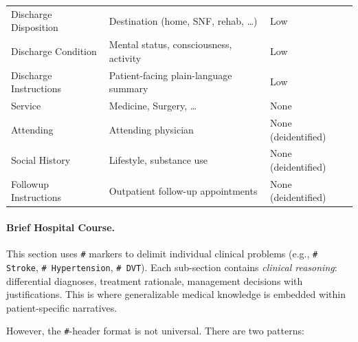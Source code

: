 \documentclass[11pt,a4paper]{article}
\begin{document}
\begin{center}
\begin{tabular}{p{4cm} p{6.5cm}p{3.8cm}}
		Discharge Disposition                     & Destination (home, SNF, rehab, \ldots)             & Low                                                 \\
		Discharge Condition                       & Mental status, consciousness, activity             & Low                                                 \\
		Discharge Instructions                    & Patient-facing plain-language summary              & Low                                                 \\
		Service                                   & Medicine, Surgery, \ldots                          & None                                                \\
		Attending                                 & Attending physician                                & None (deidentified)                                 \\
		Social History                            & Lifestyle, substance use                           & None (deidentified)                                 \\
		Followup Instructions                     & Outpatient follow-up appointments                  & None (deidentified)                                 \\
	\end{tabular}
\end{center}
\bigskip

\paragraph{Brief Hospital Course.}
This section uses \texttt{\#} markers to delimit individual clinical problems (e.g., \texttt{\# Stroke}, \texttt{\# Hypertension}, \texttt{\# DVT}).  Each sub-section contains \emph{clinical reasoning}: differential diagnoses, treatment rationale, management decisions with justifications.  This is where generalizable medical knowledge is embedded within patient-specific narratives.

However, the \texttt{\#}-header format is not universal. There are two patterns:
\end{document}

